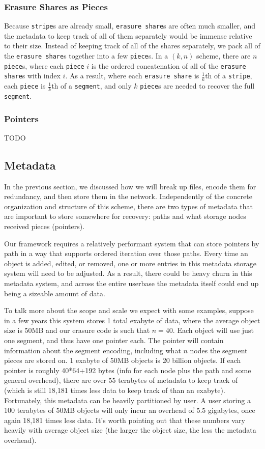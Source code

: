 \documentclass[a4paper,10pt]{article} \usepackage[utf8]{inputenc}
\newcommand{\x}[1]{{\tt #1}} \newcommand{\code}[1]{{\tt #1}}
\newcommand{\todo}[1]{{\color{red} TODO #1}}
\begin{document}
\subsubsection{Erasure Shares as Pieces}

Because \x{stripe}s are already small, \x{erasure share}s are often much
smaller, and the metadata to keep track of all of them separately would be
immense relative to their size. Instead of keeping track of all of the shares
separately, we pack all of the \x{erasure share}s together into a few
\x{piece}s. In a $(k, n)$ scheme, there are $n$ \x{piece}s, where each
\x{piece} $i$ is the ordered concatenation of all of the \x{erasure share}s with
index $i$. As a result, where each \x{erasure share} is $\frac{1}{k}$th of a
\x{stripe}, each \x{piece} is $\frac{1}{k}$th of a \x{segment}, and only $k$
\x{piece}s are needed to recover the full \x{segment}.

\subsubsection{Pointers}

\todo{}

\subsection{Metadata}

In the previous section, we discussed how we will break up files, encode them
for redundancy, and then store them in the network. Independently of the
concrete organization and structure of this scheme, there are two types of
metadata that are important to store somewhere for recovery: paths and what
storage nodes received pieces (pointers).

Our framework requires a relatively performant system that can store pointers by
path in a way that supports ordered iteration over those paths. Every time an
object is added, edited, or removed, one or more entries in this metadata
storage system will need to be adjusted. As a result, there could be heavy churn
in this metadata system, and across the entire userbase the metadata itself
could end up being a sizeable amount of data.

To talk more about the scope and scale we expect with some examples, suppose in
a few years this system stores 1 total exabyte of data, where the average object
size is 50MB and our erasure code is such that $n=40$. Each object will use just
one segment, and thus have one pointer each. The pointer will contain
information about the segment encoding, including what $n$ nodes the segment
pieces are stored on. 1 exabyte of 50MB objects is 20 billion objects. If
each pointer is roughly 40*64+192 bytes (info for each node plus the path and
some general overhead), there are over 55 terabytes of metadata to keep track of
(which is still 18,181 times less data to keep track of than an exabyte).
Fortunately, this metadata can be heavily partitioned by user. A user storing a
100 terabytes of 50MB objects will only incur an overhead of 5.5 gigabytes, once
again 18,181 times less data. It's worth pointing out that these numbers vary
heavily with average object size (the larger the object size, the less the
metadata overhead).
\end{document}
